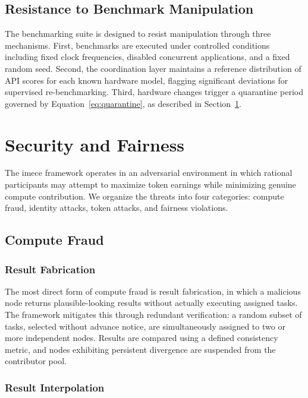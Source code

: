\documentclass[12pt]{article}
\begin{document}
\subsection{Resistance to Benchmark Manipulation}

The benchmarking suite is designed to resist manipulation through three mechanisms. First, benchmarks are executed under controlled conditions including fixed clock frequencies, disabled concurrent applications, and a fixed random seed. Second, the coordination layer maintains a reference distribution of API scores for each known hardware model, flagging significant deviations for supervised re-benchmarking. Third, hardware changes trigger a quarantine period governed by Equation~\ref{eq:quarantine}, as described in Section~\ref{sec:security}.

\section{Security and Fairness}
\label{sec:security}

The imece framework operates in an adversarial environment in which rational participants may attempt to maximize token earnings while minimizing genuine compute contribution. We organize the threats into four categories: compute fraud, identity attacks, token attacks, and fairness violations.

\subsection{Compute Fraud}

\subsubsection{Result Fabrication}

The most direct form of compute fraud is result fabrication, in which a malicious node returns plausible-looking results without actually executing assigned tasks. The framework mitigates this through redundant verification: a random subset of tasks, selected without advance notice, are simultaneously assigned to two or more independent nodes. Results are compared using a defined consistency metric, and nodes exhibiting persistent divergence are suspended from the contributor pool.

\subsubsection{Result Interpolation}
\end{document}

